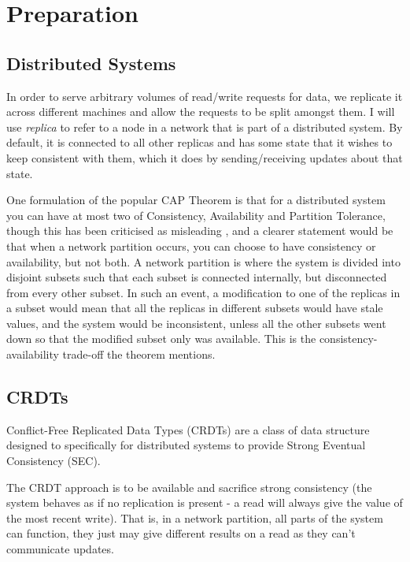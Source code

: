 \documentclass[diss.tex]{subfiles}
\begin{document}
\chapter{Preparation}\label{chap:preparation}

\section{Distributed Systems}

In order to serve arbitrary volumes of read/write requests for data, we replicate it across different machines and allow the requests to be split amongst them. I will use \textit{replica} to refer to a node in a network that is part of a distributed system. By default, it is connected to all other replicas and has some state that it wishes to keep consistent with them, which it does by sending/receiving updates about that state. 

One formulation of the popular CAP Theorem \cite{CAP} is that for a distributed system you can have at most two of Consistency, Availability and Partition Tolerance, though this has been criticised as misleading \cite{kleppmann}, and a clearer statement would be that when a network partition occurs, you can choose to have consistency or availability, but not both. A network partition is where the system is divided into disjoint subsets such that each subset is connected internally, but disconnected from every other subset. In such an event, a modification to one of the replicas in a subset would mean that all the replicas in different subsets would have stale values, and the system would be inconsistent, unless all the other subsets went down so that the modified subset only was available. This is the consistency-availability trade-off the theorem mentions.

\section{CRDTs}
Conflict-Free Replicated Data Types (CRDTs) are a class of data structure designed to specifically for distributed systems to provide Strong Eventual Consistency (SEC). 

The CRDT approach is to be available and sacrifice strong consistency (the system behaves as if no replication is present - a read will always give the value of the most recent write). That is, in a network partition, all parts of the system can function, they just may give different results on a read as they can't communicate updates.
\end{document}
